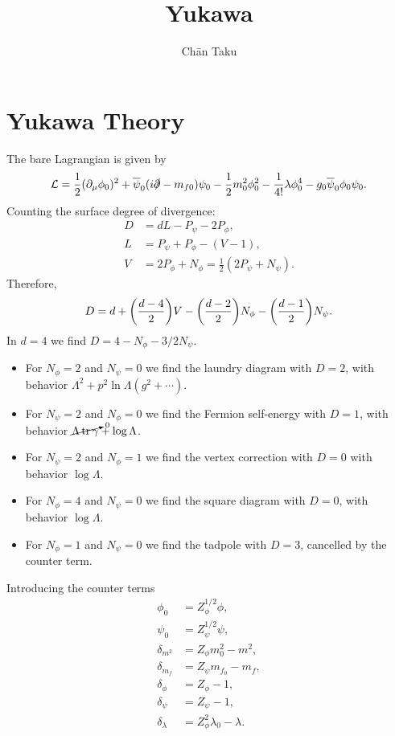 \documentclass{article}
\title{Yukawa}
\author{Ch\=an Taku}
\begin{document}
\maketitle

\section{Yukawa Theory}

The bare Lagrangian is given by
\[ \mathcal{L} = \frac{1}{2}(\partial_\mu \phi_0)^2 + \overline{\psi}_0(i\slashed{\partial} - m_{f0}) \psi_0 - \frac{1}{2} m^2_0 \phi^2_0 - \frac{1}{4!} \lambda \phi^4_0 - g_0 \overline{\psi}_0 \phi_0 \psi_0. \]
Counting the surface degree of divergence:
\begin{align*}
    D &= dL - P_\psi - 2 P_\phi, \\
    L &= P_\psi + P_\phi - (V-1), \\
    V &= 2P_\phi + N_\phi = \frac{1}{2}(2P_\psi + N_\psi).
\end{align*}
Therefore,
\[ D = d + \qty(\frac{d-4}{2})V - \qty(\frac{d-2}{2})N_\phi - \qty(\frac{d-1}{2})N_\psi. \]
In $d=4$ we find $D = 4-N_\phi - 3/2 N_\psi$.
\begin{itemize}
    \item For $N_\phi = 2$ and $N_\psi = 0$ we find the laundry diagram with $D=2$, with behavior $\Lambda^2 + p^2 \ln \Lambda (g^2 + \cdots)$.
    \item For $N_\psi = 2$ and $N_\phi = 0$ we find the Fermion self-energy with $D = 1$, with behavior $\cancelto{0}{\Lambda \tr \gamma} + \log \Lambda$.
    \item For $N_\psi = 2$ and $N_\phi = 1$ we find the vertex correction with $D=0$ with behavior $\log \Lambda$.
    \item For $N_\phi = 4$ and $N_\psi = 0$ we find the square diagram with $D = 0$, with behavior $\log \Lambda$.
    \item For $N_\phi = 1$ and $N_\psi = 0$ we find the tadpole with $D=3$, cancelled by the counter term.
\end{itemize}
Introducing the counter terms
\begin{align*}
    \phi_0 &= Z_\phi^{1/2} \phi, \\
    \psi_0 &= Z_\psi^{1/2} \psi, \\
    \delta_{m^2} &= Z_\phi m_0^2 - m^2, \\
    \delta_{m_f} &= Z_\psi m_{f_0} - m_f, \\
    \delta_\phi &= Z_\phi - 1, \\
    \delta_\psi &= Z_\psi - 1, \\
    \delta_\lambda &= Z^2_\phi \lambda_0 - \lambda.
\end{align*}
\end{document}
